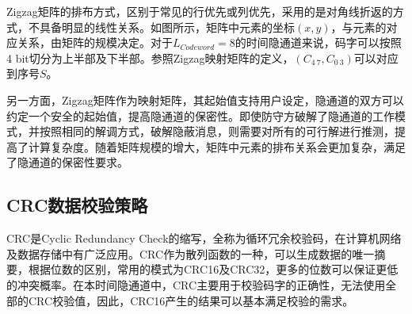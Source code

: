 
Zigzag矩阵的排布方式，区别于常见的行优先或列优先，采用的是对角线折返的方式，不具备明显的线性关系。如图所示，矩阵中元素的坐标$(x,y)$，与元素的对应关系，由矩阵的规模决定。对于$L_{Codeword}=8$的时间隐通道来说，码字可以按照4 bit切分为上半部及下半部。参照Zigzag映射矩阵的定义，$(C_{4~7},C_{0~3})$可以对应到序号$S$。

另一方面，Zigzag矩阵作为映射矩阵，其起始值支持用户设定，隐通道的双方可以约定一个安全的起始值，提高隐通道的保密性。即使防守方破解了隐通道的工作模式，并按照相同的解调方式，破解隐蔽消息，则需要对所有的可行解进行推测，提高了计算复杂度。随着矩阵规模的增大，矩阵中元素的排布关系会更加复杂，满足了隐通道的保密性要求。

\subsection{CRC数据校验策略}
\label{chap:zigzag:motivation:crc}

CRC是Cyclic Redundancy Check的缩写，全称为循环冗余校验码，在计算机网络及数据存储中有广泛应用。CRC作为散列函数的一种，可以生成数据的唯一摘要，根据位数的区别，常用的模式为CRC16及CRC32，更多的位数可以保证更低的冲突概率。在本时间隐通道中，CRC主要用于校验码字的正确性，无法使用全部的CRC校验值，因此，CRC16产生的结果可以基本满足校验的需求。


